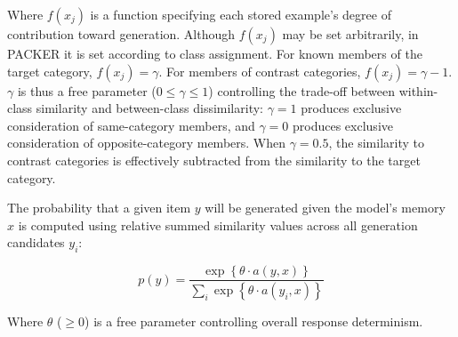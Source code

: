 \documentclass[12pt]{article} \usepackage[letterpaper, margin=1in, headheight=15pt]{geometry}
\begin{document}
Where $f(x_j)$ is a function specifying each stored example's degree of contribution toward
generation. Although $f(x_j)$ may be set arbitrarily, in PACKER it is set according to class
assignment. For known members of the target category, $f(x_j) = \gamma$. For members of contrast
categories, $f(x_j) = \gamma - 1$. $\gamma$ is thus a free parameter ($0 \leq \gamma \leq 1$)
controlling the trade-off between within-class similarity and between-class dissimilarity: $\gamma =
1$ produces exclusive consideration of same-category members, and $\gamma = 0$ produces exclusive
consideration of opposite-category members. When $\gamma = 0.5$, the similarity to contrast
categories is effectively subtracted from the similarity to the target category.

The probability that a given item $y$ will be generated given the model's memory $x$ is computed
using relative summed similarity values across all generation candidates $y_i$:

\begin{equation} p(y) = \dfrac { \exp \left \{ \theta \cdot a \left( y, x \right) \right \} } {
\sum_i{ \exp \left \{ \theta \cdot a \left( y_i, x \right) \right\} } }
\label{eq:packer-choice}
\end{equation}

Where $\theta$ ($\geq 0$) is a free parameter controlling overall response determinism.
\end{document}
